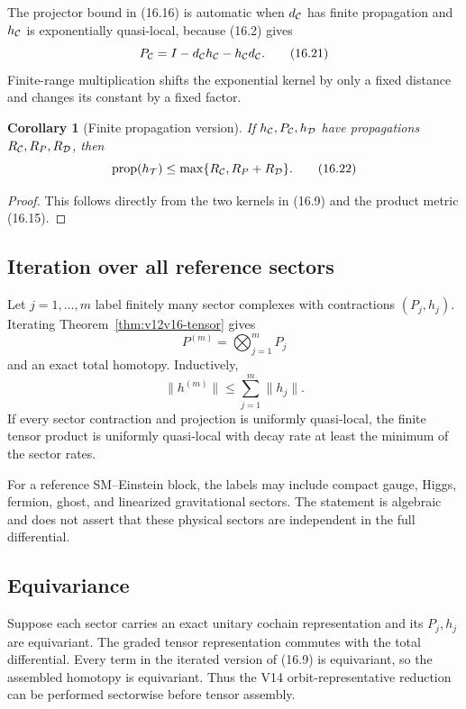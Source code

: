 \documentclass[11pt]{article}
\newtheorem{corollary}[theorem]{Corollary}
\theoremstyle{remark}
\begin{document}
The projector bound in (16.16) is automatic when \(d_{\cal C}\) has
finite propagation and \(h_{\cal C}\) is exponentially quasi-local,
because (16.2) gives
\[
 P_{\cal C}=I-d_{\cal C}h_{\cal C}-h_{\cal C}d_{\cal C}.    \tag{16.21}
\]
Finite-range multiplication shifts the exponential kernel by only a
fixed distance and changes its constant by a fixed factor.

\begin{corollary}[Finite propagation version]
\label{cor:v12v16-propagation}
If \(h_{\cal C},P_{\cal C},h_{\cal D}\) have propagations
\(R_{\cal C},R_P,R_{\cal D}\), then
\[
 \operatorname{prop}(h_{\cal T})
 \le\max\{R_{\cal C},R_P+R_{\cal D}\}.                      \tag{16.22}
\]
\end{corollary}

\begin{proof}
This follows directly from the two kernels in (16.9) and the product
metric (16.15).
\end{proof}

\subsection{Iteration over all reference sectors}

Let \(j=1,\ldots,m\) label finitely many sector complexes with
contractions \((P_j,h_j)\).  Iterating
Theorem~\ref{thm:v12v16-tensor} gives
\[
                         P^{(m)}=\bigotimes_{j=1}^mP_j      \tag{16.23}
\]
and an exact total homotopy.  Inductively,
\[
                         \|h^{(m)}\|
 \le\sum_{j=1}^m\|h_j\|.                                   \tag{16.24}
\]
If every sector contraction and projection is uniformly quasi-local,
the finite tensor product is uniformly quasi-local with decay rate
at least the minimum of the sector rates.

For a reference SM--Einstein block, the labels may include compact
gauge, Higgs, fermion, ghost, and linearized gravitational sectors.
The statement is algebraic and does not assert that these physical
sectors are independent in the full differential.

\subsection{Equivariance}

Suppose each sector carries an exact unitary cochain representation
and its \(P_j,h_j\) are equivariant.  The graded tensor
representation commutes with the total differential.  Every term in
the iterated version of (16.9) is equivariant, so the assembled
homotopy is equivariant.  Thus the V14 orbit-representative reduction
can be performed sectorwise before tensor assembly.
\end{document}
